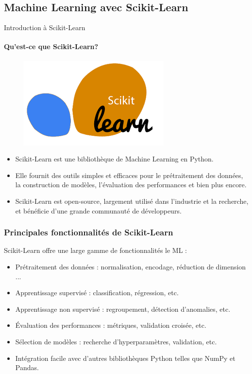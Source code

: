 \documentclass{beamer}
\begin{document}
\subsection{Machine Learning avec Scikit-Learn}
\begin{frame}{Introduction à Scikit-Learn}	
	\framesubtitle{Qu'est-ce que Scikit-Learn?}	
\begin{center}
	\begin{figure}
		\includegraphics[width=0.35\linewidth]{sklearni.png}
	\end{figure}
\end{center}
	\begin{itemize}
		\item Scikit-Learn est une bibliothèque de Machine Learning en Python.
		\item Elle fournit des outils simples et efficaces pour le prétraitement des données, la construction de modèles, l'évaluation des performances et bien plus encore.
		\item Scikit-Learn est open-source, largement utilisé dans l'industrie et la recherche, et bénéficie d'une grande communauté de développeurs.
	\end{itemize}
\end{frame}

\begin{frame}
	\frametitle{Principales fonctionnalités de Scikit-Learn}
	
	Scikit-Learn offre une large gamme de fonctionnalités le ML :
	
	\begin{itemize}
		\item Prétraitement des données : normalisation, encodage, réduction de dimension ...
		\item Apprentissage supervisé : classification, régression, etc.
		\item Apprentissage non supervisé : regroupement, détection d'anomalies, etc.
		\item Évaluation des performances : métriques, validation croisée, etc.
		\item Sélection de modèles : recherche d'hyperparamètres, validation, etc.
		\item Intégration facile avec d'autres bibliothèques Python telles que NumPy et Pandas.
	\end{itemize}
\end{frame}
\end{document}

